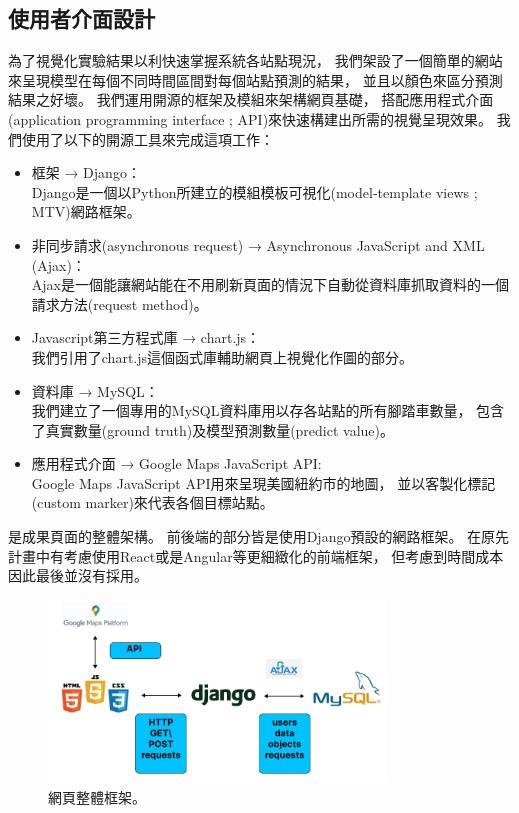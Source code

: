 \documentclass[a4paper,14pt]{extarticle}
\begin{document}
        \subsection{使用者介面設計}
            為了視覺化實驗結果以利快速掌握系統各站點現況，
            我們架設了一個簡單的網站來呈現模型在每個不同時間區間對每個站點預測的結果，
            並且以顏色來區分預測結果之好壞。
            我們運用開源的框架及模組來架構網頁基礎，
            搭配應用程式介面(application programming interface ; API)來快速構建出所需的視覺呈現效果。
            我們使用了以下的開源工具來完成這項工作：
            \begin{itemize}
                \item 框架 → Django： \\
                    Django是一個以Python所建立的模組模板可視化(model-template views ; MTV)網路框架。
                \item 非同步請求(asynchronous request) → Asynchronous JavaScript and XML (Ajax)： \\
                    Ajax是一個能讓網站能在不用刷新頁面的情況下自動從資料庫抓取資料的一個請求方法(request method)。
                \item Javascript第三方程式庫 → chart.js： \\
                    我們引用了chart.js這個函式庫輔助網頁上視覺化作圖的部分。
                \item 資料庫 → MySQL： \\
                    我們建立了一個專用的MySQL資料庫用以存各站點的所有腳踏車數量，
                    包含了真實數量(ground truth)及模型預測數量(predict value)。
                \item 應用程式介面 → Google Maps JavaScript API: \\
                    Google Maps JavaScript API用來呈現美國紐約市的地圖，
                    並以客製化標記(custom marker)來代表各個目標站點。
            \end{itemize}

            是成果頁面的整體架構。
            前後端的部分皆是使用Django預設的網路框架。
            在原先計畫中有考慮使用React或是Angular等更細緻化的前端框架，
            但考慮到時間成本因此最後並沒有採用。
            \begin{figure}[htb]
                \centering
                \includegraphics[width=0.8\textwidth]{webpage.png}
                \caption{
                    {\fontsize{12pt}{10pt}\selectfont
                        網頁整體框架。
                    }
                }
                \label{fig:webpage}
            \end{figure}
\end{document}
